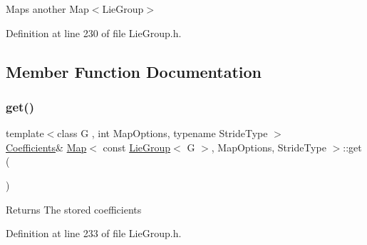 Maps another Map$<$\+Lie\+Group$>$ 

Definition at line 230 of file Lie\+Group.\+h.



\subsection{Member Function Documentation}
\hypertarget{class_map_3_01const_01_lie_group_3_01_g_01_4_00_01_map_options_00_01_stride_type_01_4_ab48c4783f796ef888b9c9dc3a78fb35a}{}\label{class_map_3_01const_01_lie_group_3_01_g_01_4_00_01_map_options_00_01_stride_type_01_4_ab48c4783f796ef888b9c9dc3a78fb35a} 
\subsubsection{\texorpdfstring{get()}{get()}\hspace{0.1cm}{\footnotesize\ttfamily [1/2]}}
{\footnotesize\ttfamily template$<$class G , int Map\+Options, typename Stride\+Type $>$ \\
\hyperlink{class_map_3_01const_01_lie_group_3_01_g_01_4_00_01_map_options_00_01_stride_type_01_4_a670729f8e6ab1131541ef46da7d09274}{Coefficients}\& \hyperlink{class_map_3_01const_01_lie_group_3_01_g_01_4_00_01_map_options_00_01_stride_type_01_4_a95174b5f6c93ceefa0fbc6ef6fdf65f7}{Map}$<$ const \hyperlink{class_lie_group}{Lie\+Group}$<$ G $>$, Map\+Options, Stride\+Type $>$\+::get (\begin{DoxyParamCaption}{ }\end{DoxyParamCaption})\hspace{0.3cm}{\ttfamily [inline]}}

\begin{DoxyReturn}{Returns}
The stored coefficients 
\end{DoxyReturn}


Definition at line 233 of file Lie\+Group.\+h.

\hypertarget{class_map_3_01const_01_lie_group_3_01_g_01_4_00_01_map_options_00_01_stride_type_01_4_aa9bd0922b1e369ac08f43921453d330c}{}\label{class_map_3_01const_01_lie_group_3_01_g_01_4_00_01_map_options_00_01_stride_type_01_4_aa9bd0922b1e369ac08f43921453d330c} 
